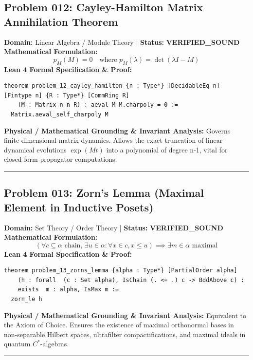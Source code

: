 \documentclass[10pt,a4paper]{article}
\begin{document}
\subsection*{Problem 012: Cayley-Hamilton Matrix Annihilation Theorem}
\textbf{Domain:} Linear Algebra / Module Theory \quad | \quad \textbf{Status:} \textcolor{green!70!black}{\textbf{VERIFIED\_SOUND}}\\
\textbf{Mathematical Formulation:}
\begin{equation*}
  p_M(M) = 0 \quad \text{where } p_M(\lambda) = \det(\lambda I - M)
\end{equation*}
\textbf{Lean 4 Formal Specification \& Proof:}
\begin{lstlisting}
theorem problem_12_cayley_hamilton {n : Type*} [DecidableEq n] [Fintype n] {R : Type*} [CommRing R] 
    (M : Matrix n n R) : aeval M M.charpoly = 0 :=
  Matrix.aeval_self_charpoly M
\end{lstlisting}
\textbf{Physical / Mathematical Grounding \& Invariant Analysis:}
Governs finite-dimensional matrix dynamics. Allows the exact truncation of linear dynamical evolutions $\exp(Mt)$ into a polynomial of degree n-1, vital for closed-form propagator computations.
\vspace{0.8em}\hrule\vspace{0.8em}
\subsection*{Problem 013: Zorn's Lemma (Maximal Element in Inductive Posets)}
\textbf{Domain:} Set Theory / Order Theory \quad | \quad \textbf{Status:} \textcolor{green!70!black}{\textbf{VERIFIED\_SOUND}}\\
\textbf{Mathematical Formulation:}
\begin{equation*}
  \left(\forall c \subseteq \alpha \text{ chain}, \, \exists u \in \alpha: \forall x \in c, x \le u\right) \implies \exists m \in \alpha \text{ maximal}
\end{equation*}
\textbf{Lean 4 Formal Specification \& Proof:}
\begin{lstlisting}
theorem problem_13_zorns_lemma {alpha : Type*} [PartialOrder alpha] 
    (h : forall  (c : Set alpha), IsChain (. <= .) c -> BddAbove c) : 
    exists  m : alpha, IsMax m :=
  zorn_le h
\end{lstlisting}
\textbf{Physical / Mathematical Grounding \& Invariant Analysis:}
Equivalent to the Axiom of Choice. Ensures the existence of maximal orthonormal bases in non-separable Hilbert spaces, ultrafilter compactifications, and maximal ideals in quantum $C^*$-algebras.
\vspace{0.8em}\hrule\vspace{0.8em}
\end{document}
